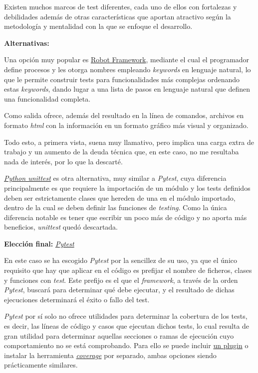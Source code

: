 Existen muchos marcos de test diferentes, cada uno de ellos con fortalezas y debilidades además de otras características que aportan atractivo según la metodología y mentalidad con la que se enfoque el desarrollo.

\textbf{Alternativas:}

Una opción muy popular es \href{https://robotframework.org/}{Robot Framework}, mediante el cual el programador define procesos y les otorga nombres empleando \textit{keywords} en lenguaje natural, lo que le permite construir tests para funcionalidades más complejas ordenando estas \textit{keywords}, dando lugar a una lista de pasos en lenguaje natural que definen una funcionalidad completa.

Como salida ofrece, además del resultado en la línea de comandos, archivos en formato \textit{html} con la información en un formato gráfico más visual y organizado.

Todo esto, a primera vista, suena muy llamativo, pero implica una carga extra de trabajo y un aumento de la deuda técnica que, en este caso, no me resultaba nada de interés, por lo que la descarté.

\href{https://docs.python.org/3/library/unittest.html}{\textit{Python unittest}} es otra alternativa, muy similar a \textit{Pytest}, cuya diferencia principalmente es que requiere la importación de un módulo y los tests definidos deben ser estrictamente clases que hereden de una en el módulo importado, dentro de la cual se deben definir las funciones de \textit{testing}. Como la única diferencia notable es tener que escribir un poco más de código y no aporta más beneficios, \textit{unittest} quedó descartada.

\textbf{Elección final:} \href{https://docs.Pytest.org/}{\textit{Pytest}}

En este caso se ha escogido \textit{Pytest} por la sencillez de su uso, ya que el único requisito que hay que aplicar en el código es prefijar el nombre de ficheros, clases y funciones con \textit{test}. Este prefijo es el que el \textit{framework}, a través de la orden \textit{Pytest}, buscará para determinar qué debe ejecutar, y el resultado de dichas ejecuciones determinará el éxito o fallo del test.

\textit{Pytest} por sí solo no ofrece utilidades para determinar la cobertura de los tests, es decir, las líneas de código y casos que ejecutan dichos tests, lo cual resulta de gran utilidad para determinar aquellas secciones o ramas de ejecución cuyo comportamiento no se está comprobando. Para ello se puede incluir \href{https://pypi.org/project/pytest-cov/}{un plugin} o instalar la herramienta \href{https://coverage.readthedocs.io/}{\textit{coverage}} por separado, ambas opciones siendo prácticamente similares.


